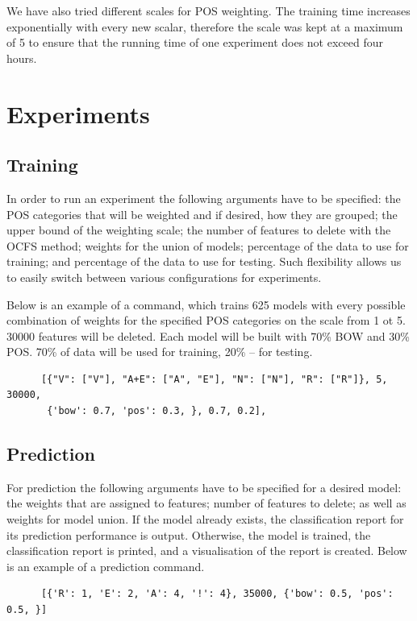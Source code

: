 \documentclass[titlepage]{article}
\begin{document}
We have also tried different scales for POS weighting. The training time increases exponentially with every new scalar, therefore the scale was kept at a maximum of 5 to ensure that the running time of one experiment does not exceed four hours.
     
     
     \section{Experiments}
     
     \subsection{Training}
     In order to run an experiment the following arguments have to be specified: the POS categories that will be weighted and if desired, how they are grouped; the upper bound of the weighting scale; the number of features to delete with the OCFS method; weights for the union of models; percentage of the data to use for training; and percentage of the data to use for testing. Such flexibility allows us to easily switch between various configurations for experiments.
     
     Below is an example of a command, which trains 625 models with every possible combination of weights for the specified POS categories on the scale from 1 ot 5. 30000 features will be deleted. Each model will be built with 70\% BOW and 30\% POS. 70\% of data will be used for training, 20\% -- for testing. 

    \begin{verbatim}
      [{"V": ["V"], "A+E": ["A", "E"], "N": ["N"], "R": ["R"]}, 5, 30000,
       {'bow': 0.7, 'pos': 0.3, }, 0.7, 0.2],
    \end{verbatim}

        \subsection{Prediction}
      For prediction the following arguments have to be specified for a desired model: the weights that are assigned to features; number of features to delete; as well as weights for model union. If the model already exists, the classification report for its prediction performance is output. Otherwise, the model is trained, the classification report is printed, and a visualisation of the report is created. Below is an example of a prediction command. 
      
          \begin{verbatim}
      [{'R': 1, 'E': 2, 'A': 4, '!': 4}, 35000, {'bow': 0.5, 'pos': 0.5, }]
          \end{verbatim}
          
\end{document}
